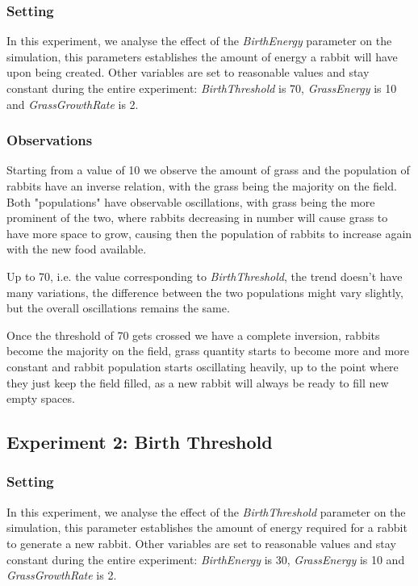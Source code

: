 \documentclass[11pt]{article}
\begin{document}
\subsubsection{Setting}

In this experiment, we analyse the effect of the \textit{BirthEnergy} parameter on the simulation, this parameters establishes the amount of energy a rabbit will have upon being created. Other variables are set to reasonable values and stay constant during the entire experiment: \textit{BirthThreshold} is 70, \textit{GrassEnergy} is 10 and \textit{GrassGrowthRate} is 2.

\subsubsection{Observations}
Starting from a value of 10 we observe the amount of grass and the population of rabbits have an inverse relation, with the grass being the majority on the field. Both "populations" have observable oscillations, with grass being the more prominent of the two, where rabbits decreasing in number will cause grass to have more space to grow, causing then the population of rabbits to increase again with the new food available.

Up to 70, i.e. the value corresponding to \textit{BirthThreshold}, the trend doesn't have many variations, the difference between the two populations might vary slightly, but the overall oscillations remains the same. 

Once the threshold of 70 gets crossed we have a complete inversion, rabbits become the majority on the field, grass quantity starts to become more and more constant and rabbit population starts oscillating heavily, up to the point where they just keep the field filled, as a new rabbit will always be ready to fill new empty spaces.

\subsection{Experiment 2: Birth Threshold}

\subsubsection{Setting}

In this experiment, we analyse the effect of the \textit{BirthThreshold} parameter on the simulation, this parameter establishes the amount of energy required for a rabbit to generate a new rabbit. Other variables are set to reasonable values and stay constant during the entire experiment: \textit{BirthEnergy} is 30, \textit{GrassEnergy} is 10 and \textit{GrassGrowthRate} is 2.
\end{document}
